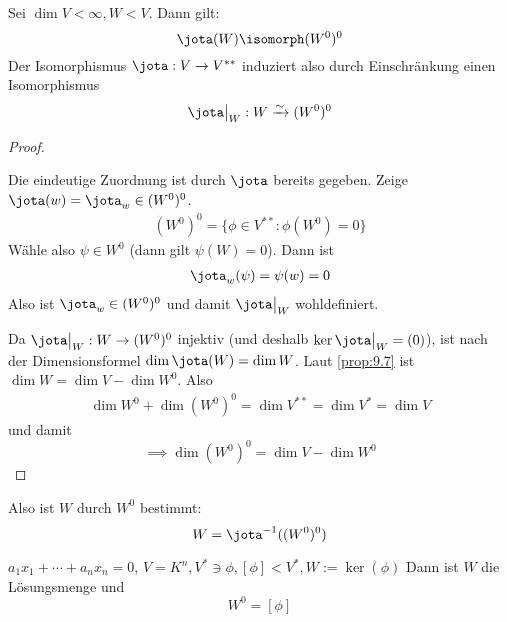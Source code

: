 \documentclass{mycourse}
\begin{document}
\begin{kor}
\label{kor:9.8}
Sei $\dim V<\infty, W<V$. Dann gilt:
\[
\jota(W)\isomorph(W^0)^0
\]
Der Isomorphismus $\jota: V\to V^{**}$ induziert also durch Einschränkung einen Isomorphismus
\[
	\jota\big|_W: W\xrightarrow{\sim} (W^0)^0
\]
\begin{proof}
	\begin{seg}[Wohldefiniertheit]
		Die eindeutige Zuordnung ist durch $\jota$ bereits gegeben.
		Zeige $\jota(w)=\jota_w\in(W^0)^0$.
\begin{align*}
(W^0)^0=\{\phi\in V^{**}:\phi(W^0)=0\}
\end{align*}
Wähle also $\psi\in W^0$ (dann gilt $\psi(W)=0$).
Dann ist
\begin{align*}
\jota_w(\psi)=\psi(w)=0
\end{align*}
Also ist $\jota_w\in (W^0)^0$ und damit $\jota\big|_W$ wohldefiniert.
\end{seg}

Da $\jota\big|_W:W\to (W^{0})^0$ injektiv (und deshalb $\ker\jota\big|_W=(0)$), ist nach der Dimensionsformel $\dim\jota(W) = \dim W$.
Laut \ref{prop:9.7} ist $\dim W=\dim V-\dim W^0$.
Also
\begin{align*}
\dim W^0 + \dim (W^0)^0 = \dim V^{**} = \dim V^* = \dim V
\end{align*}
und damit
\[
\implies \dim(W^0)^0=\dim V- \dim W^0
\]
\end{proof}
\begin{note}
Also ist $W$ durch $W^0$ bestimmt:
\[
W=\jota^{-1}((W^0)^0)
\]
\end{note}
\end{kor}


\begin{ex}
$a_1x_1+\dotsb+a_nx_n=0$, $V=K^n, V^*\ni \phi, [\phi]<V^*, W:=\ker(\phi)$ %
Dann ist $W$ die Lösungsmenge und
\[
W^0=[\phi]
\]
\end{ex}
\end{document}
